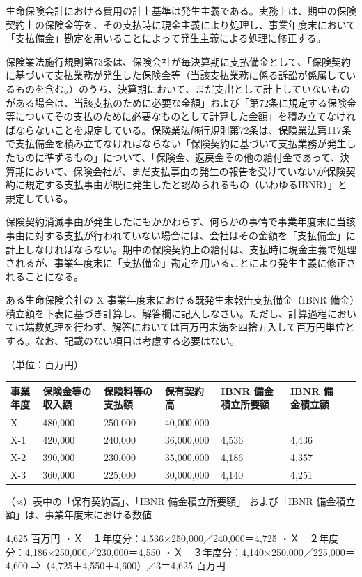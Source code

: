 \documentclass[report,gutter=10mm,fore-edge=10mm,uplatex,dvipdfmx]{jlreq}
\begin{document}
生命保険会計における費用の計上基準は発生主義である。実務上は、期中の保険契約上の保険金等を、その支払時に現金主義により処理し、事業年度末において「支払備金」勘定を用いることによって発生主義による処理に修正する。

保険業法施行規則第73条は、保険会社が毎決算期に支払備金として、「保険契約に基づいて支払業務が発生した保険金等（当該支払業務に係る訴訟が係属しているものを含む。）のうち、決算期において、まだ支出として計上していないものがある場合は、当該支払のために必要な金額」および「第72条に規定する保険金等についてその支払のために必要なものとして計算した金額」を積み立てなければならないことを規定している。保険業法施行規則第72条は、保険業法第117条で支払備金を積み立てなければならない「保険契約に基づいて支払業務が発生したものに準ずるもの」について、「保険金、返戻金その他の給付金であって、決算期において、保険会社が、まだ支払事由の発生の報告を受けていないが保険契約に規定する支払事由が既に発生したと認められるもの（いわゆるIBNR）」と規定している。

保険契約消滅事由が発生したにもかかわらず、何らかの事情で事業年度末に当該事由に対する支払が行われていない場合には、会社はその金額を「支払備金」に計上しなければならない。期中の保険契約上の給付は、支払時に現金主義で処理されるが、事業年度末に「支払備金」勘定を用いることにより発生主義に修正されることになる。


ある生命保険会社の X 事業年度末における既発生未報告支払備金（IBNR
備金）積立額を下表に基づき計算し、解答欄に記入しなさい。ただし、計算過程においては端数処理を行わず、解答においては百万円未満を四捨五入して百万円単位とする。なお、記載のない項目は考慮する必要はない。

（単位：百万円）

\begin{longtable}[]{@{}lllllll@{}}
\toprule
事業年度 & 保険金等の収入額 & 保険料等の支払額 & 保有契約高 & IBNR
備金積立所要額 & IBNR 備金積立額 &\tabularnewline
\midrule
\endhead
X & 480,000 & 250,000 & 40,000,000 & & &\tabularnewline
X-1 & 420,000 & 240,000 & 36,000,000 & 4,536 & 4,436 &\tabularnewline
X-2 & 390,000 & 230,000 & 35,000,000 & 4,186 & 4,357 &\tabularnewline
X-3 & 360,000 & 225,000 & 30,000,000 & 4,140 & 4,251 &\tabularnewline
\bottomrule
\end{longtable}

（※）表中の「保有契約高」、「IBNR 備金積立所要額」 および「IBNR
備金積立額」は、事業年度末における数値


4,625 百万円 ・Ｘ－１年度分：4,536×250,000／240,000＝4,725
・Ｘ－２年度分：4,186×250,000／230,000＝4,550
・Ｘ－３年度分：4,140×250,000／225,000＝4,600
⇒（4,725＋4,550＋4,600）／3＝4,625 百万円
\end{document}
